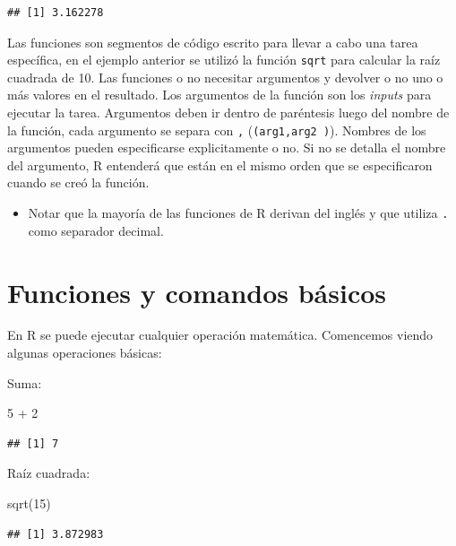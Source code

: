 \documentclass[
]{book}
\newenvironment{Shaded}{\begin{snugshade}}{\end{snugshade}}
\newcommand{\DecValTok}[1]{\textcolor[rgb]{0.00,0.00,0.81}{#1}}
\newcommand{\FunctionTok}[1]{\textcolor[rgb]{0.00,0.00,0.00}{#1}}
\newcommand{\NormalTok}[1]{#1}
\newcommand{\SpecialCharTok}[1]{\textcolor[rgb]{0.00,0.00,0.00}{#1}}
\newenvironment{rmdblock}[1]
{\begin{shaded*}
		\begin{itemize}
			\renewcommand{\labelitemi}{
				\raisebox{-.7\height}[0pt][0pt]{
					{\setkeys{Gin}{width=3em,keepaspectratio}\texttt{[image: images/\#1]}}
				}
			}
			\item
		}
		{
		\end{itemize}
	\end{shaded*}
}
\newenvironment{rmdnote}
{\begin{rmdblock}{note}}
	{\end{rmdblock}}
\begin{document}
\begin{verbatim}
## [1] 3.162278
\end{verbatim}

Las funciones son segmentos de código escrito para llevar a cabo una tarea específica, en el ejemplo anterior se utilizó la función \texttt{sqrt} para calcular la raíz cuadrada de 10. Las funciones o no necesitar argumentos y devolver o no uno o más valores en el resultado. Los argumentos de la función son los \emph{inputs} para ejecutar la tarea. Argumentos deben ir dentro de paréntesis luego del nombre de la función, cada argumento se separa con \texttt{,} (\texttt{(arg1,arg2\ )}). Nombres de los argumentos pueden especificarse explicitamente o no. Si no se detalla el nombre del argumento, R entenderá que están en el mismo orden que se especificaron cuando se creó la función.

\begin{rmdnote}
Notar que la mayoría de las funciones de R derivan del inglés y que
utiliza \texttt{.} como separador decimal.
\end{rmdnote}

\hypertarget{funciones-y-comandos-buxe1sicos}{%
\chapter{Funciones y comandos básicos}\label{funciones-y-comandos-buxe1sicos}}

En R se puede ejecutar cualquier operación matemática. Comencemos viendo algunas operaciones básicas:

Suma:

\begin{Shaded}
\begin{Highlighting}[]
\DecValTok{5} \SpecialCharTok{+} \DecValTok{2}
\end{Highlighting}
\end{Shaded}

\begin{verbatim}
## [1] 7
\end{verbatim}

Raíz cuadrada:

\begin{Shaded}
\begin{Highlighting}[]
\FunctionTok{sqrt}\NormalTok{(}\DecValTok{15}\NormalTok{)}
\end{Highlighting}
\end{Shaded}

\begin{verbatim}
## [1] 3.872983
\end{verbatim}
\end{document}
